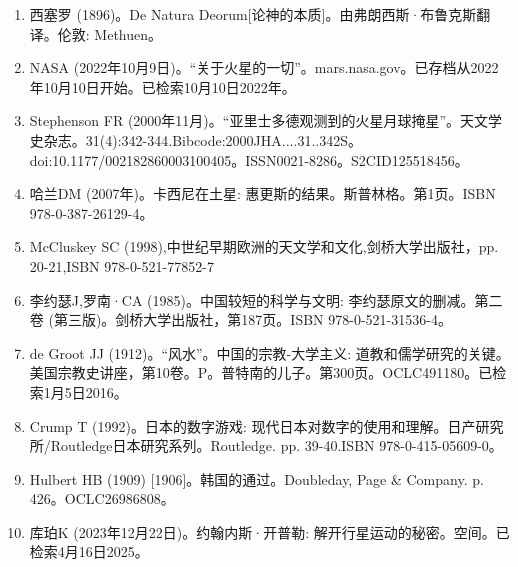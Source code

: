\begin{enumerate}
\item 西塞罗 (1896)。De Natura Deorum[论神的本质]。由弗朗西斯·布鲁克斯翻译。伦敦: Methuen。
\item NASA (2022年10月9日)。“关于火星的一切”。mars.nasa.gov。已存档从2022年10月10日开始。已检索10月10日2022年。
\item Stephenson FR (2000年11月)。“亚里士多德观测到的火星月球掩星”。天文学史杂志。31(4):342-344.Bibcode:2000JHA....31..342S。doi:10.1177/002182860003100405。ISSN0021-8286。S2CID125518456。  
\item 哈兰DM (2007年)。卡西尼在土星: 惠更斯的结果。斯普林格。第1页。ISBN 978-0-387-26129-4。
\item McCluskey SC (1998),中世纪早期欧洲的天文学和文化,剑桥大学出版社，pp. 20-21,ISBN 978-0-521-77852-7
\item 李约瑟J,罗南·CA (1985)。中国较短的科学与文明: 李约瑟原文的删减。第二卷 (第三版)。剑桥大学出版社，第187页。ISBN 978-0-521-31536-4。
\item de Groot JJ (1912)。“风水”。中国的宗教-大学主义: 道教和儒学研究的关键。美国宗教史讲座，第10卷。P。普特南的儿子。第300页。OCLC491180。已检索1月5日2016。 
\item Crump T (1992)。日本的数字游戏: 现代日本对数字的使用和理解。日产研究所/Routledge日本研究系列。Routledge. pp. 39-40.ISBN 978-0-415-05609-0。
\item Hulbert HB (1909) [1906]。韩国的通过。Doubleday, Page & Company. p. 426。OCLC26986808。 
\item 库珀K (2023年12月22日)。约翰内斯·开普勒: 解开行星运动的秘密。空间。已检索4月16日2025。




\end{enumerate}